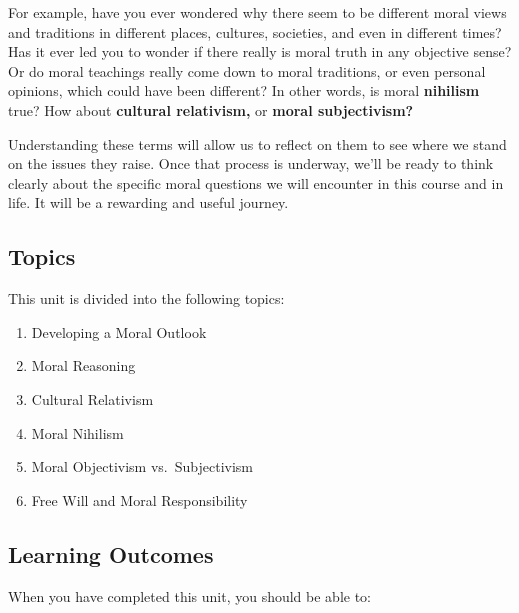 \documentclass[
]{book}
\providecommand{\tightlist}{%
  \setlength{\itemsep}{0pt}\setlength{\parskip}{0pt}}
\begin{document}
For example, have you ever wondered why there seem to be different moral views and traditions in different places, cultures, societies, and even in different times? Has it ever led you to wonder if there really is moral truth in any objective sense? Or do moral teachings really come down to moral traditions, or even personal opinions, which could have been different? In other words, is moral \textbf{nihilism} true? How about \textbf{cultural relativism,} or \textbf{moral subjectivism?}

Understanding these terms will allow us to reflect on them to see where we stand on the issues they raise. Once that process is underway, we'll be ready to think clearly about the specific moral questions we will encounter in this course and in life. It will be a rewarding and useful journey.

\hypertarget{topics}{%
\subsection*{Topics}\label{topics}}

This unit is divided into the following topics:

\begin{enumerate}
\def\labelenumi{\arabic{enumi}.}
\tightlist
\item
  Developing a Moral Outlook\\
\item
  Moral Reasoning\\
\item
  Cultural Relativism\\
\item
  Moral Nihilism\\
\item
  Moral Objectivism vs.~Subjectivism\\
\item
  Free Will and Moral Responsibility
\end{enumerate}

\hypertarget{learning-outcomes}{%
\subsection*{Learning Outcomes}\label{learning-outcomes}}

When you have completed this unit, you should be able to:
\end{document}
